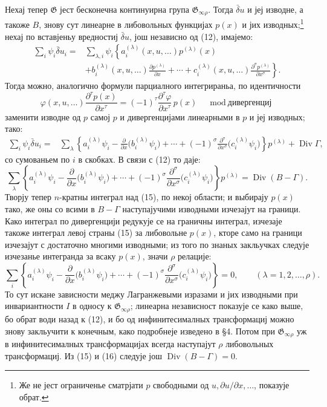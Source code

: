 ﻿\documentclass[11pt]{article}
\providecommand{\G}{\mathfrak G}
\providecommand{\p}{\partial}
\DeclareMathOperator{\Div}{Div}
\providecommand{\bd}{\bar{\delta}}
\begin{document}
Нехај тепер \(\G\) јест бесконечна континуирна група \(\G_{\infty\rho}\). Тогда \(\bd u\) и јеј изводне, а такоже \(B\), знову сут линеарне в либовольных функцијах \(p(x)\) и јих изводных;\footnote{Же не јест ограниченье сматрјати \(p\) свободными од \(u,\p u/\p x,\ldots\), показује обрат.} нехај по вставјеньу вредностиј \(\bd u\), још независно од (12), имајемо:
\[
\begin{aligned}
\sum_i\psi_i\bd u_i
={}&\sum_{\lambda,i}\psi_i\left\{
a_i^{(\lambda)}(x,u,\ldots)p^{(\lambda)}(x)\right.\\
&\left.
+b_i^{(\lambda)}(x,u,\ldots)\frac{\p p^{(\lambda)}}{\p x}
+\cdots+c_i^{(\lambda)}(x,u,\ldots)
\frac{\p^\sigma p^{(\lambda)}}{\p x^\sigma}\right\}.
\end{aligned}
\]
Тогда можно, аналогично формули парциалного интегрираньа, по идентичности
\[
\varphi(x,u,\ldots)\frac{\p^\tau p(x)}{\p x^\tau}
=(-1)^\tau\frac{\p^\tau\varphi}{\p x^\tau}\,p(x)
\quad \bmod \text{дивергенциј}
\]
заменити изводне од \(p\) самој \(p\) и дивергенцијами линеарными в \(p\) и јеј изводных; тако:
\begin{equation}
\begin{aligned}
\sum_i\psi_i\bd u_i
={}&\sum_\lambda\left\{
a_i^{(\lambda)}\psi_i-\frac{\p}{\p x}\bigl(b_i^{(\lambda)}\psi_i\bigr)
+\cdots+(-1)^\sigma
\frac{\p^\sigma}{\p x^\sigma}\bigl(c_i^{(\lambda)}\psi_i\bigr)
\right\}p^{(\lambda)}+\Div\Gamma,
\end{aligned}
\tag{14}
\end{equation}
со сумованьем по \(i\) в скобках. В связи с (12) то даје:
\begin{equation}
\sum_\lambda\left\{
a_i^{(\lambda)}\psi_i-\frac{\p}{\p x}\bigl(b_i^{(\lambda)}\psi_i\bigr)
+\cdots+(-1)^\sigma
\frac{\p^\sigma}{\p x^\sigma}\bigl(c_i^{(\lambda)}\psi_i\bigr)
\right\}p^{(\lambda)}
=\Div(B-\Gamma).
\tag{15}
\end{equation}
Творју тепер \(n\)-кратны интеграл над (15), по некој области; и выбирају \(p(x)\) тако, же оны со всими в \(B-\Gamma\) наступајучими изводными изчезајут на граници. Како интеграл по дивергенцији редукује се на граничны интеграл, изчезаје такоже интеграл левој страны (15) за либовольне \(p(x)\), кторе само на граници изчезајут с достаточно многими изводными; из того по знаных закльучках следује изчезанье интегранда за всаку \(p(x)\), значи \(\rho\) релације:
\begin{equation}
\sum_i\left\{
a_i^{(\lambda)}\psi_i-\frac{\p}{\p x}\bigl(b_i^{(\lambda)}\psi_i\bigr)
+\cdots+(-1)^\sigma
\frac{\p^\sigma}{\p x^\sigma}\bigl(c_i^{(\lambda)}\psi_i\bigr)
\right\}=0,\qquad(\lambda=1,2,\ldots,\rho).
\tag{16}
\end{equation}
То сут искане зависности меджу Лагранжевыми изразами и јих изводными при инвариантности \(I\) в односу к \(\G_{\infty\rho}\); линеарна независност показује се како выше, бо обрат води назад к (12), и бо од инфинитесималных трансформациј можно знову закльучити к конечным, како подробнеје изведено в \S{}4. Потом при \(\G_{\infty\rho}\) уж в инфинитесималных трансформацијах всегда наступајут \(\rho\) либовольных трансформациј. Из (15) и (16) следује још \(\Div(B-\Gamma)=0\).
\end{document}
